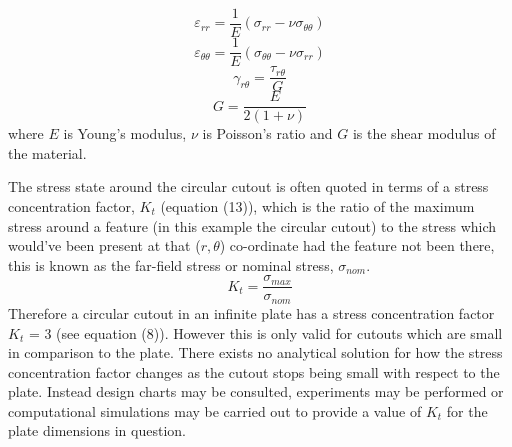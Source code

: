 \documentclass[11pt,twocolumn]{article} %
\begin{document}
\begin{equation} %
	\varepsilon_{rr} = \frac{1}{E}(\sigma_{rr}-\nu\sigma_{\theta\theta})
\end{equation}
\begin{equation} %
	\varepsilon_{\theta\theta} = \frac{1}{E}(\sigma_{\theta\theta}-\nu\sigma_{rr})
\end{equation}
\begin{equation} %
	\gamma_{r\theta} = \frac{\tau_{r\theta}}{G}
\end{equation}
\begin{equation} %
	G = \frac{E}{2(1 + \nu)}
\end{equation}
where $E$ is Young's modulus, $\nu$ is Poisson's ratio and $G$ is the shear modulus of the material. 
\linebreak\par 
The stress state around the circular cutout is often quoted in terms of a stress concentration factor, $K_{t}$ (equation (13)), which is the ratio of the maximum stress around a feature (in this example the circular cutout) to the stress which would've been present at that ($r, \theta$) co-ordinate had the feature not been there, this is known as the far-field stress or  nominal stress, $\sigma_{nom}$. 
\begin{equation} %
	K_{t} = \frac{\sigma_{max}}{\sigma_{nom}}
\end{equation}
Therefore  a circular cutout in an infinite plate has a stress concentration factor $K_{t}$ = 3 (see equation (8)). However this is only valid for cutouts which are small in comparison to the plate. There exists no analytical solution for how the stress concentration factor changes as the cutout stops being small with respect to the plate. Instead design charts may be consulted, experiments may be performed or computational simulations may be carried out to provide a value of $K_{t}$ for the plate dimensions in question. 

\end{document}
